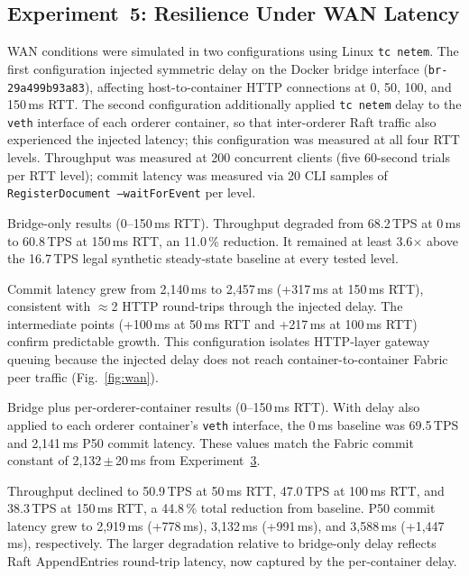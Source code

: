 \documentclass{ieeeaccess}
\begin{document}
\subsection{Experiment~5: Resilience Under WAN Latency}
\label{sec:exp_wan}

WAN conditions were simulated in two configurations using Linux
\texttt{tc netem}. The first configuration injected symmetric delay
on the Docker bridge interface (\texttt{br-29a499b93a83}), affecting
host-to-container HTTP connections at 0, 50, 100, and 150\,ms RTT.
The second configuration additionally applied \texttt{tc netem} delay
to the \texttt{veth} interface of each orderer container, so that
inter-orderer Raft traffic also experienced the injected latency; this configuration was measured at all four RTT
levels. Throughput was measured at 200 concurrent clients (five
60-second trials per RTT level); commit latency was measured via 20
CLI samples of \texttt{RegisterDocument --waitForEvent} per level.

Bridge-only results (0--150\,ms RTT).
Throughput degraded from 68.2\,TPS at 0\,ms to 60.8\,TPS at 150\,ms RTT,
an 11.0\,\% reduction. It remained at least 3.6$\times$ above the
16.7\,TPS legal synthetic steady-state baseline at every tested level.

Commit latency grew from 2,140\,ms to 2,457\,ms (+317\,ms at 150\,ms RTT),
consistent with $\approx$2 HTTP round-trips through the injected delay. The
intermediate points (+100\,ms at 50\,ms RTT and +217\,ms at 100\,ms RTT)
confirm predictable growth. This configuration isolates HTTP-layer gateway
queuing because the injected delay does not reach container-to-container
Fabric peer traffic (Fig.~\ref{fig:wan}).

Bridge plus per-orderer-container results (0--150\,ms RTT).
With delay also applied to each orderer container's \texttt{veth} interface,
the 0\,ms baseline was 69.5\,TPS and 2,141\,ms P50 commit latency.
These values match the Fabric commit constant of 2,132\,$\pm$\,20\,ms from
Experiment~\hyperref[sec:exp_filesize]{3}.

Throughput declined to 50.9\,TPS at 50\,ms RTT,
47.0\,TPS at 100\,ms RTT, and 38.3\,TPS at 150\,ms RTT,
a 44.8\,\% total reduction from baseline. P50 commit latency grew
to 2,919\,ms (+778\,ms), 3,132\,ms (+991\,ms), and 3,588\,ms
(+1,447\,ms), respectively. The larger degradation relative to bridge-only
delay reflects Raft AppendEntries round-trip latency, now captured by the
per-container delay.
\end{document}
